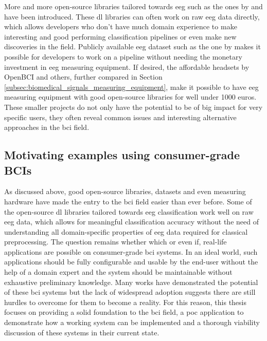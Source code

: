 More and more open-source  libraries tailored towards \gls{eeg} such as the ones by \citet{eeg_model_hbm} and \citet{eeg_model_eegnet} have been introduced.
These \gls{dl} libraries can often work on raw \gls{eeg} data directly, which allows developers who don't have much domain experience to make interesting and good performing classification pipelines or even make new discoveries in the field.
Publicly available \gls{eeg} dataset such as the one by \citet{eeg_data} makes it possible for developers to work on a pipeline without needing the monetary investment in \gls{eeg} measuring equipment.
If desired, the affordable headsets by OpenBCI and others, further compared in Section \ref{subsec:biomedical_signals_measuring_equipment}, make it possible to have \gls{eeg} measuring equipment with good open-source libraries for well under 1000 euros.
These smaller projects do not only have the potential to be of big impact for very specific users, they often reveal common issues and interesting alternative approaches in the \gls{bci} field.


\subsection{Motivating examples using consumer-grade BCIs}
\label{subsec:bci_opportunities_obstacles_motivating_examples}

As discussed above, good open-source libraries, datasets and even measuring hardware have made the entry to the \gls{bci} field easier than ever before.
Some of the open-source \gls{dl} libraries tailored towards \gls{eeg} classification work well on raw \gls{eeg} data, which allows for meaningful classification accuracy without the need of understanding all domain-specific properties of \gls{eeg} data required for classical preprocessing.
The question remains whether which or even if, real-life applications are possible on consumer-grade \gls{bci} systems.
In an ideal world, such applications should be fully configurable and usable by the end-user without the help of a domain expert and the system should be maintainable without exhaustive preliminary knowledge. 
Many works have demonstrated the potential of these \gls{bci} systems but the lack of widespread adoption suggests there are still hurdles to overcome for them to become a reality.
For this reason, this thesis focuses on providing a solid foundation to the \gls{bci} field, a \gls{poc} application to demonstrate how a working system can be implemented and a thorough viability discussion of these systems in their current state.

